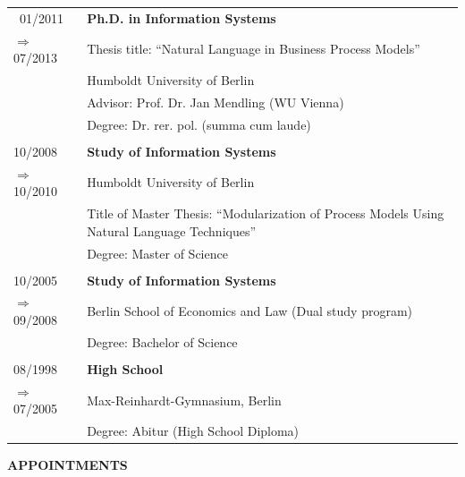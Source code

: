 \documentclass[titlepage]{article}
\newcommand{\heading}[1] {
\vspace*{0.7cm}\noindent \textcolor{myred}{\large{\textbf{\uppercase{{#1}}}}} \\[-5pt]
\noindent\makebox[\linewidth]{\rule{\textwidth}{0.4pt}\vspace*{0.2cm}}
}
\begin{document}
\raggedright
\begin{tabular}{P{3cm}P{12cm}}
\
01/2011   													& \textbf{Ph.D. in Information Systems} \\
\hspace*{0.4cm}$\Rightarrow$  07/2013	& Thesis title: ``Natural Language in Business Process Models'' \\
																	& Humboldt University of Berlin \\
																	& Advisor: Prof. Dr. Jan Mendling (WU Vienna) \\
																	& Degree: Dr. rer. pol. (summa cum laude) \\
																	\\
10/2008														& \textbf{Study of Information Systems} \\
\hspace*{0.4cm}$\Rightarrow$  10/2010	&  Humboldt University of Berlin  \\																	
																	&  Title of Master Thesis: ``Modularization of Process Models Using Natural Language Techniques'' \\
																	& Degree: Master of Science \\
																	\\
10/2005 														& \textbf{Study of Information Systems} \\
\hspace*{0.4cm}$\Rightarrow$  09/2008	&	Berlin School of Economics and Law (Dual study program) \\															
																	& Degree: Bachelor of Science \\
																	\\
08/1998														& \textbf{High School} \\ 
\hspace*{0.4cm}$\Rightarrow$  07/2005	& Max-Reinhardt-Gymnasium, Berlin \\																
																	& Degree: Abitur (High School Diploma) \\
\end{tabular}


\heading{Appointments}
\end{document}

